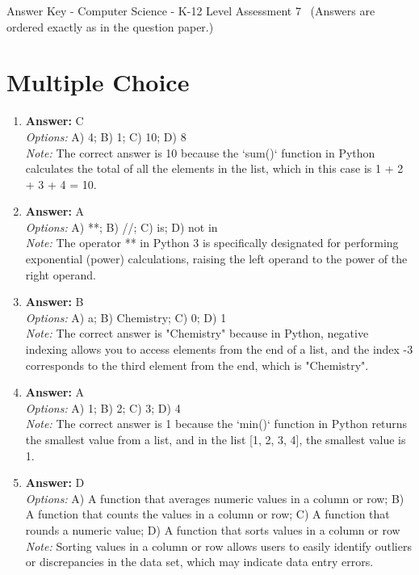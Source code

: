 \documentclass[12pt]{article}
\begin{document}
\begin{center}
Answer Key - Computer Science - K-12 Level Assessment 7 \
\small (Answers are ordered exactly as in the question paper.)
\end{center}

\section*{Multiple Choice}
\begin{enumerate}[label=\arabic*.]
\item \textbf{Answer:} C
\\ \textit{Options:} A) 4; B) 1; C) 10; D) 8
\\ \textit{Note:} The correct answer is 10 because the `sum()` function in Python calculates the total of all the elements in the list, which in this case is 1 + 2 + 3 + 4 = 10.
\item \textbf{Answer:} A
\\ \textit{Options:} A) **; B) //; C) is; D) not in
\\ \textit{Note:} The operator ** in Python 3 is specifically designated for performing exponential (power) calculations, raising the left operand to the power of the right operand.
\item \textbf{Answer:} B
\\ \textit{Options:} A) a; B) Chemistry; C) 0; D) 1
\\ \textit{Note:} The correct answer is "Chemistry" because in Python, negative indexing allows you to access elements from the end of a list, and the index -3 corresponds to the third element from the end, which is "Chemistry".
\item \textbf{Answer:} A
\\ \textit{Options:} A) 1; B) 2; C) 3; D) 4
\\ \textit{Note:} The correct answer is 1 because the `min()` function in Python returns the smallest value from a list, and in the list [1, 2, 3, 4], the smallest value is 1.
\item \textbf{Answer:} D
\\ \textit{Options:} A) A function that averages numeric values in a column or row; B) A function that counts the values in a column or row; C) A function that rounds a numeric value; D) A function that sorts values in a column or row
\\ \textit{Note:} Sorting values in a column or row allows users to easily identify outliers or discrepancies in the data set, which may indicate data entry errors.
\end{enumerate}
\end{document}
